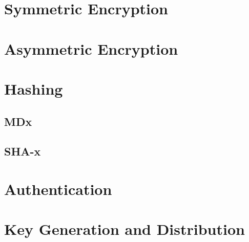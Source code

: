 \section{Symmetric Encryption}\label{sec:sd:crypto:sym}


\section{Asymmetric Encryption}\label{sec:sd:crypto:asym}


\section{Hashing}\label{sec:sd:crypto:hash}

\subsection{MDx}

\subsection{SHA-x}

\section{Authentication}\label{sec:sd:crypto:auth}

\section{Key Generation and Distribution}

